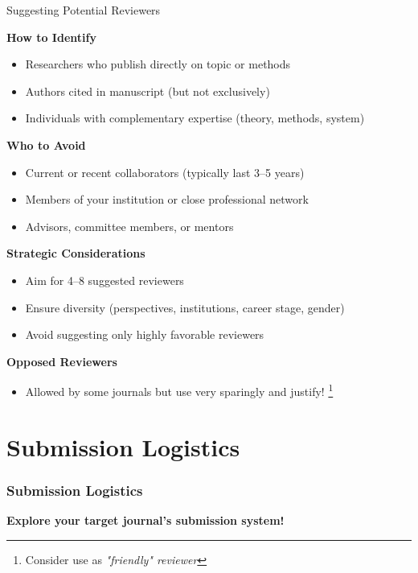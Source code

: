 \documentclass{beamer}
\begin{document}
\begin{frame}{Suggesting Potential Reviewers}

\textbf{How to Identify}
\begin{itemize}
    \item Researchers who publish directly on topic or methods
    \item Authors cited in manuscript (but not exclusively)
    \item Individuals with complementary expertise (theory, methods, system)
\end{itemize}

\medskip

\textbf{Who to Avoid}
\begin{itemize}
    \item Current or recent collaborators (typically last 3--5 years)
    \item Members of your institution or close professional network
    \item Advisors, committee members, or mentors
\end{itemize}

\medskip

\textbf{Strategic Considerations}
\begin{itemize}
    \item Aim for 4--8 suggested reviewers
    \item Ensure diversity (perspectives, institutions, career stage, gender)
    \item Avoid suggesting only highly favorable reviewers
\end{itemize}

\medskip

\textbf{Opposed Reviewers}
\begin{itemize}
    \item Allowed by some journals but use very sparingly and justify!%
    \footnote{\scriptsize{Consider use as \textit{"friendly" reviewer}}}
\end{itemize}

\end{frame}


\section{Submission Logistics}

\begin{frame}
  \frametitle{Submission Logistics}
  \begin{center}
      \textbf{Explore your target journal's submission system!}
  \end{center}
\end{frame}
\end{document}
